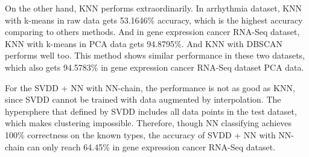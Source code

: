 \documentclass[twocolumn,10pt]{article}
\begin{document}
  On the other hand, KNN performs extraordinarily. In arrhythmia dataset, KNN with k-means in raw data gets 53.1646\% 
  accuracy, which is the highest accuracy comparing to others methods. And in gene expression cancer RNA-Seq dataset, 
  KNN with k-means in PCA data gets 94.8795\%. And KNN with DBSCAN performs well too. This method shows similar performance 
  in these two datasets, which also gets 94.5783\% in gene expression cancer RNA-Seq dataset PCA data. 

  For the SVDD + NN with NN-chain, the performance is not as good as KNN, since SVDD cannot be trained with data augmented by 
  interpolation. The hypersphere that defined by SVDD includes all data points in the test dataset, which makes 
  clustering impossible. Therefore, though NN classifying achieves 100\% correctness on the known types, 
  the accuracy of SVDD + NN with NN-chain can only reach 64.45\% in gene expression cancer RNA-Seq dataset. 
\end{document}
